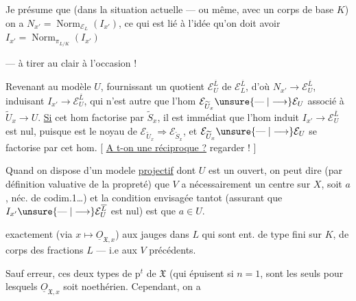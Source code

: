 Je présume que (dans la situation actuelle --- ou même, avec un corps de base $K$) on a $N_{x'}=\operatorname{Norm}_{\mathcal E_L}(I_{x'})$,  ce qui est lié à l'idée qu'on doit avoir $I_{x'}=\operatorname{Norm}_{\pi_{L/K}}(I_{x'})$

--- à tirer au clair à l'occasion !

Revenant au modèle $U$, fournissant un quotient $\mathcal E_U^{\overline L}$ de $\mathcal E_L^{\overline L}$, d'où $N_{x'}\longrightarrow\mathcal E_U^{\overline L}$, induisant $I_{x'}\longrightarrow\mathcal E_U^{\overline L}$,
qui n'est autre que l'hom  $\mathcal E_{\widetilde U_x}\unsure{\mathrel{\text{---}}|\longrightarrow}\mathcal E_U$ associé à $\widetilde U_x\longrightarrow U$. \uline{Si} cet hom factorise par $\widetilde S_x$, il est immédiat que l'hom induit $I_{x'}\longrightarrow\mathcal E_U^{\overline L}$ est nul, puisque  est le noyau de $\mathcal E_{\widetilde U_x}\Longrightarrow\mathcal E_{\widetilde S_x}$, et $\mathcal E_{\widetilde U_x}\unsure{\mathrel{\text{---}}|\longrightarrow}\mathcal E_U$ se factorise par cet hom.
[ \uline{A t-on une réciproque ?} regarder ! ]

Quand on dispose d'un modele \uline{projectif} dont $U$ est un ouvert, on peut dire (par définition valuative de la propreté) que $V$ a nécessairement un centre sur $X$, soit $a$,   néc. de codim.1\ldots) et la condition envisagée tantot (assurant que $I_{x'}\unsure{\mathrel{\text{---}}|\longrightarrow}\mathcal E_U^{\overline L}$ est nul) est que $a\in U$.

 exactement (via $x\longmapsto\underline{O}_{\mathfrak X,x}$) aux jauges dans $L$ qui sont ent. de type fini sur $K$, de corps des fractions $L$ --- i.e aux $V$ précédents.

Sauf erreur, ces deux types de p$^t$ de $\mathfrak X$ (qui épuisent  si $n=1$, \unsure{)}  sont les seuls pour lesquels $\underline{O}_{\mathfrak X,x}$ soit noethérien. Cependant, on a

